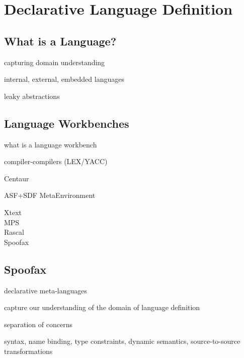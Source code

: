\newpage
\chapter{Declarative Language Definition}


\section{What is a Language?}

capturing domain understanding

internal, external, embedded languages

leaky abstractions

\newpage
\section{Language Workbenches}

what is a language workbench

compiler-compilers (LEX/YACC)

Centaur

ASF+SDF MetaEnvironment

\begin{description}
\item[Xtext]
\item[MPS]
\item[Rascal]
\item[Spoofax]
\end{description}

\section{Spoofax}

declarative meta-languages

capture our understanding of the domain of language definition

separation of concerns

syntax, name binding, type constraints, dynamic semantics, source-to-source
transformations
